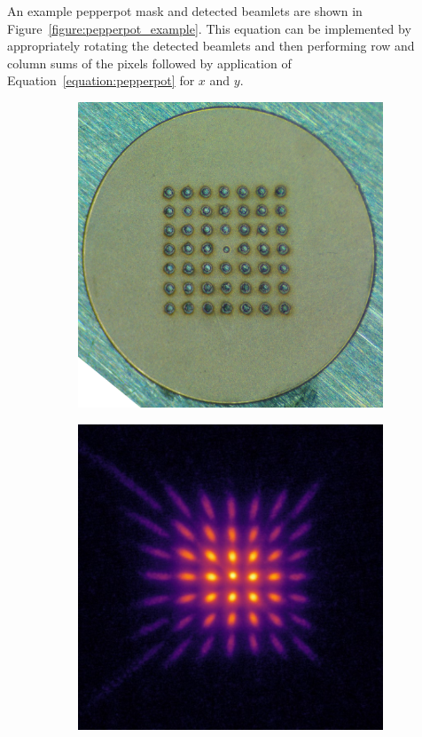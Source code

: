 An example pepperpot mask and detected beamlets are shown in Figure~\ref{figure:pepperpot_example}.
This equation can be implemented by appropriately rotating the detected beamlets and then performing row and column sums of the pixels followed by application of Equation~\ref{equation:pepperpot} for $x$ and $y$.

\begin{figure}
    \centering
    \begin{subfigure}{0.49\linewidth}
    \centering
    \includegraphics[width=\linewidth]{part2/Figs/example_pepperpot_mask.jpg}
    \caption{}
    \label{figure:pepperpot_mask}
    \end{subfigure}
    \begin{subfigure}{0.49\linewidth}
    \centering
    \includegraphics[width=\linewidth]{part2/Figs/example_pepperpot_detector_linear.jpeg}

\end{subfigure}
\end{figure}

